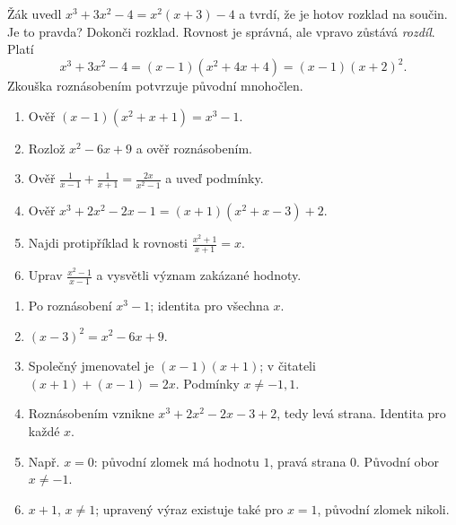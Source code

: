 \documentclass[11pt,a4paper]{article}
\begin{document}
\begin{zadaniReseniBox}[breakable=false,title={Rozšíření 1}]
Žák uvedl $x^3+3x^2-4=x^2(x+3)-4$ a tvrdí, že je hotov rozklad na součin. Je to pravda? Dokonči rozklad.
\tcblower
Rovnost je správná, ale vpravo zůstává \emph{rozdíl}. Platí
\[x^3+3x^2-4=(x-1)(x^2+4x+4)=(x-1)(x+2)^2.\]
Zkouška roznásobením potvrzuje původní mnohočlen.
\end{zadaniReseniBox}
\begin{zadaniReseniBox}[breakable=false,title={Domácí úkol}]
\begin{enumerate}[label=\alph*)]
\item Ověř $(x-1)(x^2+x+1)=x^3-1$.
\item Rozlož $x^2-6x+9$ a ověř roznásobením.
\item Ověř $\frac1{x-1}+\frac1{x+1}=\frac{2x}{x^2-1}$ a uveď podmínky.
\item Ověř $x^3+2x^2-2x-1=(x+1)(x^2+x-3)+2$.
\item Najdi protipříklad k rovnosti $\frac{x^2+1}{x+1}=x$.
\item Uprav $\frac{x^2-1}{x-1}$ a vysvětli význam zakázané hodnoty.
\end{enumerate}
\tcblower
\begin{enumerate}[label=\alph*)]
\item Po roznásobení $x^3-1$; identita pro všechna $x$.
\item $(x-3)^2=x^2-6x+9$.
\item Společný jmenovatel je $(x-1)(x+1)$; v čitateli $(x+1)+(x-1)=2x$. Podmínky $x\ne-1,1$.
\item Roznásobením vznikne $x^3+2x^2-2x-3+2$, tedy levá strana. Identita pro každé $x$.
\item Např. $x=0$: původní zlomek má hodnotu $1$, pravá strana $0$. Původní obor $x\ne-1$.
\item $x+1$, $x\ne1$; upravený výraz existuje také pro $x=1$, původní zlomek nikoli.
\end{enumerate}
\end{zadaniReseniBox}
\end{document}

